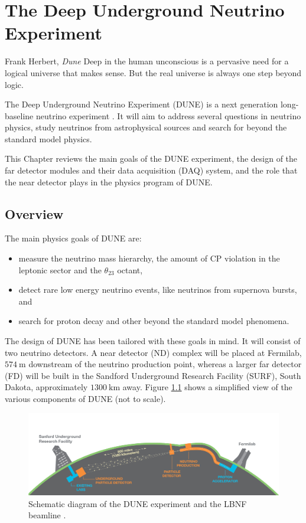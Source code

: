 \chapter{The Deep Underground Neutrino Experiment}
\label{chapter:dune}

\begin{chapquote}{Frank Herbert, \textit{Dune}}
	Deep in the human unconscious is a pervasive need for a logical universe that makes sense. But the real universe is always one step beyond logic.
\end{chapquote}

The Deep Underground Neutrino Experiment (DUNE) is a next generation long-baseline neutrino experiment \cite{DUNE2020TDR1}.  It will aim to address several questions in neutrino physics, study neutrinos from astrophysical sources and search for beyond the standard model physics.

This Chapter reviews the main goals of the DUNE experiment, the design of the far detector modules and their data acquisition (DAQ) system, and the role that the near detector plays in the physics program of DUNE.

\section{Overview}

The main physics goals of DUNE are:
\begin{itemize}
	\item measure the neutrino mass hierarchy, the amount of CP violation in the leptonic sector and the $\theta_{23}$ octant,
	\item detect rare low energy neutrino events, like neutrinos from supernova bursts, and
	\item search for proton decay and other beyond the standard model phenomena.
\end{itemize}

The design of DUNE has been tailored with these goals in mind. It will consist of two neutrino detectors. A near detector (ND) complex will be placed at Fermilab, $574~\mathrm{m}$ downstream of the neutrino production point, whereas a larger far detector (FD) will be built in the Sandford Underground Research Facility (SURF), South Dakota, approximately $1300~\mathrm{km}$ away. Figure \ref{fig:dune} shows a simplified view of the various components of DUNE (not to scale).

\begin{figure}[t]
	\centering
	\includegraphics[width=0.9\linewidth]{Images/DUNE/FD/dune}
	\caption[Schematic diagram of the DUNE experiment and the LBNF beamline.]{Schematic diagram of the DUNE experiment and the LBNF beamline \cite{DUNE2020TDR1}.}
	\label{fig:dune}
\end{figure}

